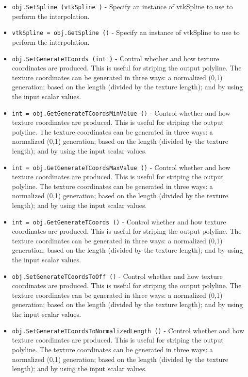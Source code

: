 \begin{itemize}
\item  \verb|obj.SetSpline (vtkSpline )| -  Specify an instance of vtkSpline to use to perform the interpolation.

\item  \verb|vtkSpline = obj.GetSpline ()| -  Specify an instance of vtkSpline to use to perform the interpolation.

\item  \verb|obj.SetGenerateTCoords (int )| -  Control whether and how texture coordinates are produced. This is
 useful for striping the output polyline. The texture coordinates
 can be generated in three ways: a normalized (0,1) generation;
 based on the length (divided by the texture length); and by using
 the input scalar values.

\item  \verb|int = obj.GetGenerateTCoordsMinValue ()| -  Control whether and how texture coordinates are produced. This is
 useful for striping the output polyline. The texture coordinates
 can be generated in three ways: a normalized (0,1) generation;
 based on the length (divided by the texture length); and by using
 the input scalar values.

\item  \verb|int = obj.GetGenerateTCoordsMaxValue ()| -  Control whether and how texture coordinates are produced. This is
 useful for striping the output polyline. The texture coordinates
 can be generated in three ways: a normalized (0,1) generation;
 based on the length (divided by the texture length); and by using
 the input scalar values.

\item  \verb|int = obj.GetGenerateTCoords ()| -  Control whether and how texture coordinates are produced. This is
 useful for striping the output polyline. The texture coordinates
 can be generated in three ways: a normalized (0,1) generation;
 based on the length (divided by the texture length); and by using
 the input scalar values.

\item  \verb|obj.SetGenerateTCoordsToOff ()| -  Control whether and how texture coordinates are produced. This is
 useful for striping the output polyline. The texture coordinates
 can be generated in three ways: a normalized (0,1) generation;
 based on the length (divided by the texture length); and by using
 the input scalar values.

\item  \verb|obj.SetGenerateTCoordsToNormalizedLength ()| -  Control whether and how texture coordinates are produced. This is
 useful for striping the output polyline. The texture coordinates
 can be generated in three ways: a normalized (0,1) generation;
 based on the length (divided by the texture length); and by using
 the input scalar values.


\end{itemize}
